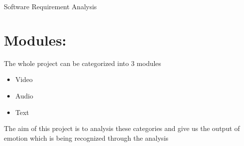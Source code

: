 \begin{center}
	{\Huge Software Requirement Analysis}
\end{center}
\setcounter{section}{0}

\section{Modules:}
The whole project can be categorized into 3 modules
\begin{itemize}
	\item Video
	\item Audio
	\item Text
\end{itemize}
The aim of this project is to analysis these categories and give us the output of emotion which is being recognized through the analysis

